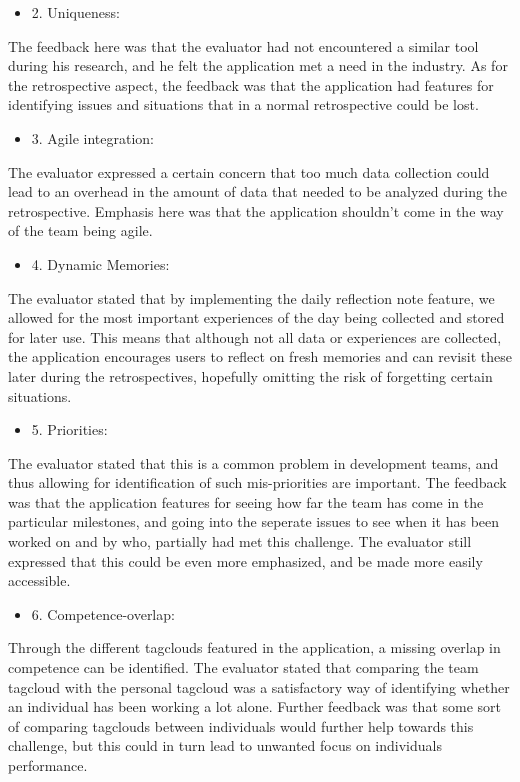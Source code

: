 \begin{itemize}
    \item 2. Uniqueness: 
\end{itemize}
The feedback here was that the evaluator had not encountered a similar tool during his research, and he felt the application met a need in the industry. As for the retrospective aspect, the feedback was that the application had features for identifying issues and situations that in a normal retrospective could be lost.  

\begin{itemize}
    \item 3. Agile integration: 
\end{itemize}
The evaluator expressed a certain concern that too much data collection could lead to an overhead in the amount of data that needed to be analyzed during the retrospective. Emphasis here was that the application shouldn't come in the way of the team being agile. 

\begin{itemize}
    \item 4. Dynamic Memories:
\end{itemize}
 The evaluator stated that by implementing the daily reflection note feature, we allowed for the most important experiences of the day being collected and stored for later use. This means that although not all data or experiences are collected, the application encourages users to reflect on fresh memories and can revisit these later during the retrospectives, hopefully omitting the risk of forgetting certain situations. 

\begin{itemize}
    \item 5. Priorities: 
\end{itemize}
The evaluator stated that this is a common problem in development teams, and thus allowing for identification of such mis-priorities are important. The feedback was that the application features for seeing how far the team has come in the particular milestones, and going into the seperate issues to see when it has been worked on and by who, partially had met this challenge. The evaluator still expressed that this could be even more emphasized, and be made more easily accessible. 

\begin{itemize}
    \item 6. Competence-overlap:  
\end{itemize}
Through the different tagclouds featured in the application, a missing overlap in competence can be identified. The evaluator stated that comparing the team tagcloud with the personal tagcloud was a satisfactory way of identifying whether an individual has been working a lot alone. Further feedback was that some sort of comparing tagclouds between individuals would further help towards this challenge, but this could in turn lead to unwanted focus on individuals performance.

